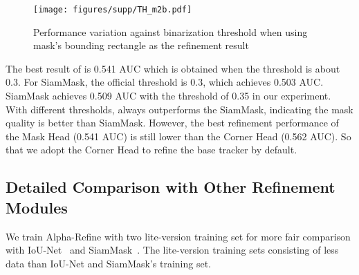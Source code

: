 \documentclass[final]{cvpr}
\begin{document}
{\begin{appendices}
\begin{figure}[!h]
\centering
\texttt{[image: figures/supp/TH\_m2b.pdf]}
\caption{Performance variation against binarization threshold when using mask's bounding rectangle as the refinement result} \label{fig:mask2box}
\end{figure} 

The best result of  is 0.541 AUC which is obtained when the threshold is about 0.3. For SiamMask, the official threshold is 0.3, which achieves 0.503 AUC. SiamMask achieves 0.509 AUC  with the threshold of 0.35 in our experiment. With different thresholds,  always outperforms the SiamMask, indicating the mask quality is better than SiamMask. However, the best refinement performance of the Mask Head (0.541 AUC) is still lower than the Corner Head (0.562 AUC). So that we adopt the Corner Head to refine the base tracker by default.


\subsection{Detailed Comparison with Other Refinement Modules}

We train Alpha-Refine with two lite-version training set for more fair comparison with IoU-Net~\cite{ATOM,DiMP} and SiamMask~\cite{SiamMask}. The lite-version training sets consisting of less data than IoU-Net and SiamMask's training set.


\begin{table}[!h]
    \centering
    \caption{Comparison with other refinement module on the \textit{LaSOT test} set. 
    ``Base tracker-AR'' represents base tracker with Alpha-Refine.  stand for the output of mask head with threshold 0.3 is used as the refinement result.
    The best three results are marked in \textbf{\textcolor[rgb]{1,0,0}{red}}, \textbf{\textcolor[rgb]{0,1,0}{green}} and \textbf{\textcolor[rgb]{0,0,1}{blue}} bold fonts respectively.  and  indicate Alpha-Refine modules trained with a lite version of training set which intersects with IoUNet's and SiamMask's training set respectively.
    Better viewed in color with zoom-in.}
    \vspace{2mm}
    
\end{table}
\end{appendices}}
\end{document}
